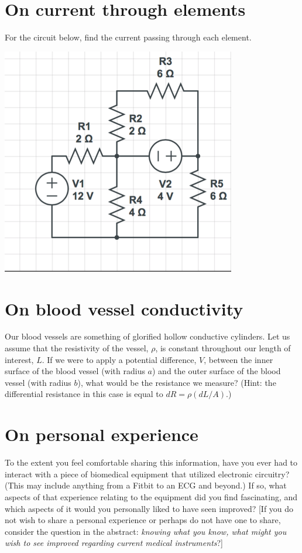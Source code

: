 \documentclass[11pt]{book}
\begin{document}
\section{On current through elements}
For the circuit below, find the current passing through each element.

\begin{center}\includegraphics{figures/hw2.08.png}\end{center}

\section{On blood vessel conductivity}
Our blood vessels are something of glorified hollow conductive cylinders. Let us assume that the resistivity of the vessel, $\rho$, is constant throughout our length of interest, $L$. If we were to apply a potential difference, $V$, between the inner surface of the blood vessel (with radius $a$) and the outer surface of the blood vessel (with radius $b$), what would be the resistance we measure? (Hint: the differential resistance in this case is equal to $dR = \rho(dL/A)$.)

\section{On personal experience}
To the extent you feel comfortable sharing this information, have you ever had to interact with a piece of biomedical equipment that utilized electronic circuitry? (This may include anything from a Fitbit to an ECG and beyond.) If so, what aspects of that experience relating to the equipment did you find fascinating, and which aspects of it would you personally liked to have seen improved? [If you do not wish to share a personal experience or perhaps do not have one to share, consider the question in the abstract: \textit{knowing what you know, what might you wish to see improved regarding current medical instruments}?]
\end{document}
